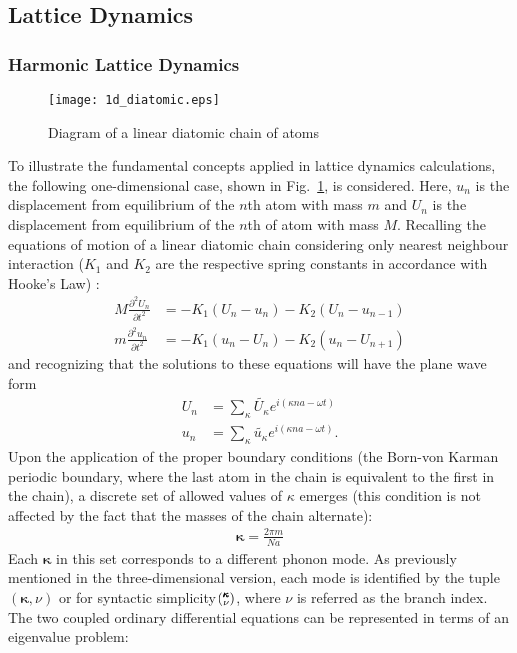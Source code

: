 \subsection{Lattice Dynamics}
\subsubsection{Harmonic Lattice Dynamics}\label{SEC:HLD}
\begin{figure}%
\centering
\texttt{[image: 1d\_diatomic.eps]}
\caption{Diagram of a linear diatomic chain of atoms}
\label{FIG:diatomic}
\end{figure}
To illustrate the fundamental concepts applied in lattice dynamics calculations, the following one-dimensional case, shown in Fig.~\ref{FIG:diatomic}, is considered. Here, $u_n$ is the displacement from equilibrium of the $n$th atom with mass $m$ and $U_n$ is the displacement from equilibrium of the $n$th of atom with mass $M$. Recalling the equations of motion of a linear diatomic chain considering only nearest neighbour interaction ($K_1$ and $K_2$ are the respective spring constants in accordance with Hooke's Law) \cite{dove_introduction_1993-3}:
%
\begin{align}
	M\frac{\partial ^2 U_n}{\partial t^2}&=-K_1(U_n-u_n)-K_2(U_n-u_{n-1})\\
	m\frac{\partial ^2 u_n}{\partial t^2}&=-K_1(u_n-U_n)-K_2(u_n-U_{n+1})
\end{align}
%
and recognizing that the solutions to these equations will have the plane wave form
%
\begin{align}
	U_n&=\sum_\kappa \tilde{U_\kappa}e^{i(\kappa na-\omega t)}\\
	u_n&=\sum_\kappa \tilde{u_\kappa}e^{i(\kappa na-\omega t)}.
\end{align}
%
Upon the application of the proper boundary conditions (the Born-von Karman periodic boundary, where the last atom in the chain is equivalent to the first in the chain), a discrete set of allowed values of $\kappa$ emerges (this condition is not affected by the fact that the masses of the chain alternate):
%
\begin{align}
	\pmb{\kappa}=\frac{2\pi m}{Na}
\end{align}
%
Each $\pmb{\kappa}$ in this set corresponds to a different phonon mode. As previously mentioned in the three-dimensional version, each mode is identified by the tuple $(\pmb{\kappa},\nu)$ or for syntactic simplicity $\mspace{-4.0mu}\left(\mspace{-8.0mu} \begin{smallmatrix}&\pmb{\kappa} \\&\nu\end{smallmatrix} \mspace{-3.0mu}\right)$, where $\nu$ is referred as the branch index.  The two coupled ordinary differential equations can be represented in terms of an eigenvalue problem:
